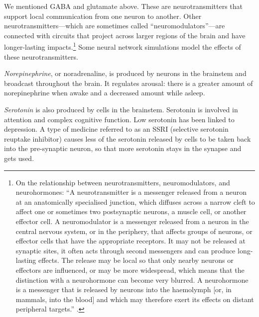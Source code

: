 We mentioned GABA and glutamate above. These are neurotransmitters that support local communication from one neuron to another. Other neurotransmitters---which are sometimes called ``neuromodulators''---are connected with circuits that project across larger regions of the brain and have longer-lasting impacts.\footnote{On the relationship between neurotransmitters, neuromodulators, and neurohormones: ``A neurotransmitter is a messenger released from a neuron at an anatomically specialised junction, which diffuses across a narrow cleft to affect one or sometimes two postsynaptic neurons, a muscle cell, or another effector cell. A neuromodulator is a messenger released from a neuron in the central nervous system, or in the periphery, that affects groups of neurons, or effector cells that have the appropriate receptors. It may not be released at synaptic sites, it often acts through second messengers and can produce long-lasting effects. The release may be local so that only nearby neurons or effectors are influenced, or may be more widespread, which means that the distinction with a neurohormone can become very blurred. A neurohormone is a messenger that is released by neurons into the haemolymph [or, in mammals, into the blood] and which may therefore exert its effects on distant peripheral targets.'' \cite{burrows1996neurobiology}.}   Some neural network simulations model the effects of these neurotransmitters.

\emph{Norepinephrine}, or noradrenaline, is produced by neurons in the brainstem and broadcast throughout the brain. It regulates arousal: there is a greater amount of norepinephrine when awake and a decreased amount while asleep. 


\emph{Serotonin} is also produced by cells in the brainstem. Serotonin is involved in attention and complex cognitive function. Low serotonin has been linked to depression. A type of medicine referred to as an SSRI (selective serotonin reuptake inhibitor) causes less of the serotonin released by cells to be taken back into the pre-synaptic neuron, so that more serotonin stays in the synapse and gets used. 

